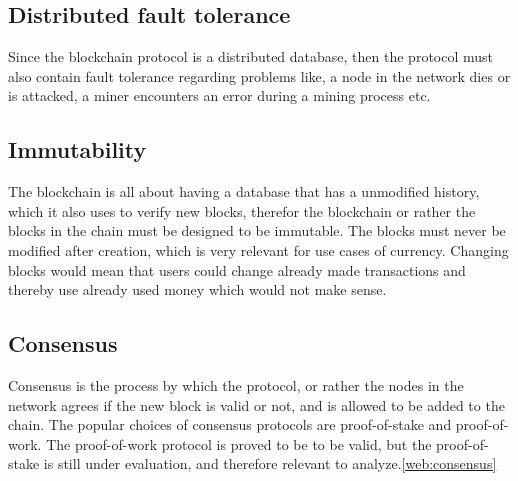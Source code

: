 
\subsection{Distributed fault tolerance}
Since the blockchain protocol is a distributed database, then the protocol must also contain fault tolerance regarding problems like, a node in the network dies or is attacked, a miner encounters an error during a mining process etc.

\subsection{Immutability}
The blockchain is all about having a database that has a unmodified history, which it also uses to verify new blocks, therefor the blockchain or rather the blocks in the chain must be designed to be immutable. The blocks must never be modified after creation, which is very relevant for use cases of currency. Changing blocks would mean that users could change already made transactions and thereby use already used money which would not make sense.

\subsection{Consensus}
Consensus is the process by which the protocol, or rather the nodes in the network agrees if the new block is valid or not, and is allowed to be added to the chain. The popular choices of consensus protocols are proof-of-stake and proof-of-work. The proof-of-work protocol is proved to be to be valid, but the proof-of-stake is still under evaluation, and therefore relevant to analyze.\ref{web:consensus}

